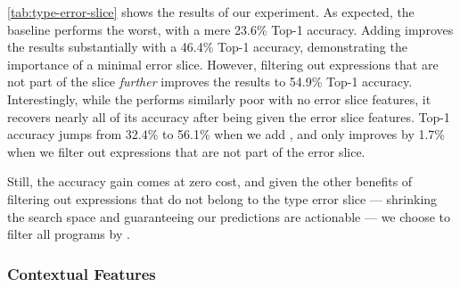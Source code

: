 \autoref{tab:type-error-slice} shows the results of our experiment.
%
As expected, the baseline performs the worst, with a mere 23.6\% \linear
Top-1 accuracy.
%
Adding \InSlice improves the results substantially with a 46.4\% \linear Top-1
accuracy, demonstrating the importance of a minimal error slice.
%
However, filtering out expressions that are not part of the slice
\emph{further} improves the results to 54.9\% \linear Top-1 accuracy.
%
Interestingly, while the \hiddenFH performs similarly poor with no error
slice features, it recovers nearly all of its accuracy after being given
the error slice features.
%
Top-1 accuracy jumps from 32.4\% to 56.1\% when we add \InSlice, and only
improves by 1.7\% when we filter out expressions that are not part of the
error slice.

Still, the accuracy gain comes at zero cost, and given the other benefits
of filtering out expressions that do not belong to the type error slice
--- shrinking the search space and guaranteeing our predictions are actionable ---
we choose to filter all programs by \InSlice.

\subsubsection{Contextual Features}
\label{sec:contextual-features}

